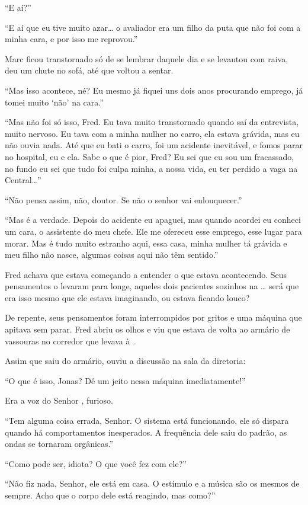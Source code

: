 ``E aí?''

``E aí que eu tive muito azar\ldots{} o avaliador era um filho da puta que
não foi com a minha cara, e por isso me reprovou.''

Marc ficou transtornado só de se lembrar daquele dia e se levantou com
raiva, deu um chute no sofá, até que voltou a sentar.

``Mas isso acontece, né? Eu mesmo já fiquei uns dois anos procurando
emprego, já tomei muito `não' na cara.''

``Mas não foi só isso, Fred. Eu tava muito transtornado quando saí da
entrevista, muito nervoso. Eu tava com a minha mulher no carro, ela
estava grávida, mas eu não ouvia nada. Até que eu bati o carro, foi um
acidente inevitável, e fomos parar no hospital, eu e ela. Sabe o que é
pior, Fred? Eu sei que eu sou um fracassado, no fundo eu sei que tudo
foi culpa minha, a nossa vida, eu ter perdido a vaga na Central\ldots{}''

``Não pensa assim, não, doutor. Se não o senhor vai
enlouquecer.''

``Mas é a verdade. Depois do acidente eu apaguei, mas quando acordei eu
conheci um cara, o assistente do meu chefe. Ele me ofereceu esse
emprego, esse lugar para morar. Mas é tudo muito estranho aqui, essa
casa, minha mulher tá grávida e meu filho não nasce, algumas coisas aqui
não têm sentido.''

Fred achava que estava começando a entender o que estava acontecendo.
Seus pensamentos o levaram para longe, aqueles dois pacientes sozinhos
na \ldots{} será que era isso mesmo que ele estava imaginando,
ou estava ficando louco?

De repente, seus pensamentos foram interrompidos por gritos e uma
máquina que apitava sem parar. Fred abriu os olhos e viu que estava de
volta ao armário de vassouras no corredor que levava à .

Assim que saiu do armário, ouviu a discussão na sala da diretoria:

``O que é isso, Jonas? Dê um jeito nessa máquina imediatamente!''

Era a voz do Senhor , furioso.

``Tem alguma coisa errada, Senhor. O sistema está funcionando, ele só
dispara quando há comportamentos inesperados. A frequência dele saiu do
padrão, as ondas se tornaram orgânicas.''

``Como pode ser, idiota? O que você fez com ele?''

``Não fiz nada, Senhor, ele está em casa. O estímulo e a música são os
mesmos de sempre. Acho que o corpo dele está reagindo, mas
como?''

